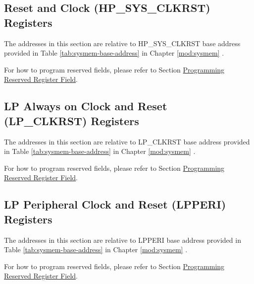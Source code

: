 \documentclass[main\_\_EN.tex]{subfiles}
\begin{document}
\subsection{Reset and Clock (HP\_SYS\_CLKRST) Registers}

The addresses in this section are relative to HP\_SYS\_CLKRST base address provided in Table \ref{tab:sysmem-base-address} in Chapter \ref{mod:sysmem} \textit{}.

For how to program reserved fields, please refer to Section \hyperref[programming-reserved-field]{Programming Reserved Register Field}.



\subsection{LP Always on Clock and Reset (LP\_CLKRST) Registers}

The addresses in this section are relative to LP\_CLKRST base address provided in Table \ref{tab:sysmem-base-address} in Chapter \ref{mod:sysmem} \textit{}.

For how to program reserved fields, please refer to Section \hyperref[programming-reserved-field]{Programming Reserved Register Field}.



\subsection{LP Peripheral Clock and Reset (LPPERI) Registers}

The addresses in this section are relative to LPPERI base address provided in Table \ref{tab:sysmem-base-address} in Chapter \ref{mod:sysmem} \textit{}.

For how to program reserved fields, please refer to Section \hyperref[programming-reserved-field]{Programming Reserved Register Field}.


\end{document}
